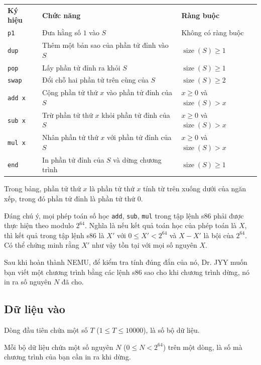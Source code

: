 \documentclass[11pt]{article}
\begin{document}
\begin{center}
\begin{tabular}{lll}
\textbf{Ký hiệu} & \textbf{Chức năng} & \textbf{Ràng buộc}\\
\texttt{p1} & Đưa hằng số \(1\) vào \(S\) & Không có ràng buộc\\
\texttt{dup} & Thêm một bản sao của phần tử đỉnh vào \(S\) &
  \(\operatorname{size}(S)\ge 1\)\\
\texttt{pop} & Lấy phần tử đỉnh ra khỏi \(S\) &
  \(\operatorname{size}(S)\ge 1\)\\
\texttt{swap} & Đổi chỗ hai phần tử trên cùng của \(S\) &
  \(\operatorname{size}(S)\ge 2\)\\
\texttt{add x} & Cộng phần tử thứ \(x\) vào phần tử đỉnh của \(S\) &
  \(x\ge 0\) và \(\operatorname{size}(S)>x\)\\
\texttt{sub x} & Trừ phần tử thứ \(x\) khỏi phần tử đỉnh của \(S\) &
  \(x\ge 0\) và \(\operatorname{size}(S)>x\)\\
\texttt{mul x} & Nhân phần tử thứ \(x\) với phần tử đỉnh của \(S\) &
  \(x\ge 0\) và \(\operatorname{size}(S)>x\)\\
\texttt{end} & In phần tử đỉnh của \(S\) và dừng chương trình &
  \(\operatorname{size}(S)\ge 1\)
\end{tabular}
\end{center}

Trong bảng, phần tử thứ \(x\) là phần tử thứ \(x\) tính từ trên xuống dưới
của ngăn xếp, trong đó phần tử đỉnh là phần tử thứ \(0\).

Đáng chú ý, mọi phép toán số học \texttt{add}, \texttt{sub}, \texttt{mul}
trong tập lệnh s86 phải được thực hiện theo modulo \(2^{64}\). Nghĩa là nếu
kết quả toán học của phép toán là \(X\), thì kết quả trong tập lệnh s86 là
\(X'\) với \(0\le X'<2^{64}\) và \(X-X'\) là bội của \(2^{64}\). Có thể chứng
minh rằng \(X'\) như vậy tồn tại với mọi số nguyên \(X\).

Sau khi hoàn thành NEMU, để kiểm tra tính đúng đắn của nó, Dr. JYY muốn bạn
viết một chương trình bằng các lệnh s86 sao cho khi chương trình dừng, nó in
ra số nguyên \(N\) đã cho.

\subsection*{Dữ liệu vào}

Dòng đầu tiên chứa một số \(T\) (\(1\le T\le 10000\)), là số bộ dữ liệu.

Mỗi bộ dữ liệu chứa một số nguyên \(N\) (\(0\le N<2^{64}\)) trên một dòng, là
số mà chương trình của bạn cần in ra khi dừng.
\end{document}
